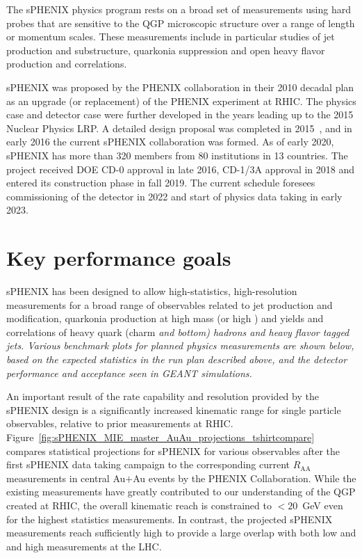 The sPHENIX physics program rests on a broad set of measurements using hard probes that are sensitive to the QGP microscopic structure over a range of length or momentum scales. These measurements include in particular studies of jet production and substructure, quarkonia suppression and open heavy flavor production and correlations.  

sPHENIX was proposed by the PHENIX collaboration in their 2010 decadal plan as an upgrade (or replacement) of the PHENIX experiment at RHIC. The physics case and detector case were further developed in the years leading up to the 2015 Nuclear Physics LRP. A detailed design proposal was completed in 2015~\cite{sPHENIX:2015irh}, and in early 2016 the current sPHENIX collaboration was formed. As of early 2020, sPHENIX has more than 320 members from 80 institutions in 13 countries. The project received DOE CD-0 approval in late 2016, CD-1/3A approval in 2018 and entered its
construction phase in fall 2019. The current schedule foresees commissioning of the detector in 2022 and start of physics data taking in early 2023.

\section{Key performance goals}

sPHENIX has been designed to allow high-statistics, high-resolution measurements for a broad
range of observables related to jet production and modification, quarkonia production
at high mass (or high \pt) and yields and correlations of heavy quark (charm \em and \em bottom) hadrons and heavy flavor tagged jets. Various benchmark plots for planned physics
measurements are shown below, based on the expected statistics in the run plan described
above, and the detector performance and acceptance seen in GEANT simulations.

An important result of the rate capability and resolution provided by the sPHENIX design
is a significantly increased kinematic range for single particle observables, relative
to prior measurements at RHIC.
Figure~\ref{fig:sPHENIX_MIE_master_AuAu_projections_tshirtcompare} compares
statistical projections for sPHENIX for various observables after the first sPHENIX data
taking campaign to the corresponding current $R_\mathrm{AA}$ measurements in central
Au$+$Au events by the PHENIX Collaboration.
While the existing measurements have greatly contributed to our
understanding of the QGP created at RHIC, the overall kinematic reach is
constrained to $< 20$~GeV even for the highest statistics
measurements. In contrast, the projected sPHENIX measurements reach sufficiently high \pt to
provide a large overlap with both low and and high \pt measurements at the LHC.

